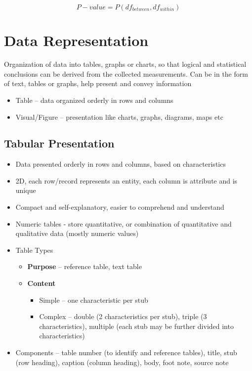\documentclass{article}
\begin{document}
\begin{equation}
    P-value = P(df_{between}, df_{within})
\end{equation}

\section{Data Representation}

Organization of data into tables, graphs or charts, so that logical and statistical conclusions can be derived from the collected measurements. Can be in the form of text, tables or graphs, help present and convey information
\begin{itemize}
    \item Table -- data organized orderly in rows and columns
    \item Visual/Figure -- presentation like charts, graphs, diagrams, maps etc
\end{itemize}

\subsection{Tabular Presentation}

\begin{itemize}
    \item Data presented orderly in rows and columns, based on characteristics
    \item 2D, each row/record represents an entity, each column is attribute and is unique
    \item Compact and self-explanatory, easier to comprehend and understand
    \item Numeric tables - store quantitative, or combination of quantitative and qualitative data (mostly numeric values)
    \item Table Types
    \begin{itemize}
        \item \textbf{Purpose} -- reference table, text table
        \item \textbf{Content}
        \begin{itemize}
            \item Simple -- one characteristic per stub
            \item Complex -- double (2 characteristics per stub), triple (3 characteristics), multiple (each stub may be further divided into characteristics)
        \end{itemize}
    \end{itemize}
    \item Components -- table number (to identify and reference tables), title, stub (row heading), caption (column heading), body, foot note, source note
\end{itemize}
\end{document}
